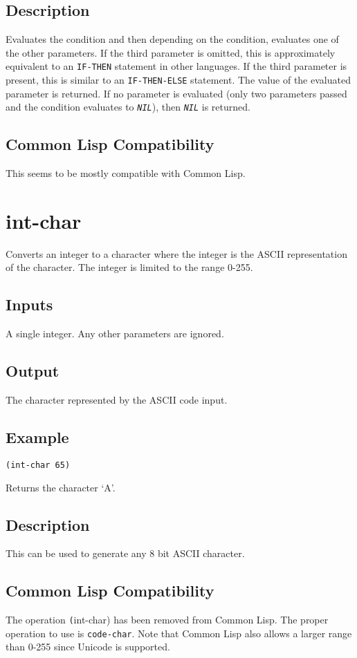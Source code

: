 \documentclass[10pt, openany]{book}
\newcommand{\constant}[1]{\emph{\texttt{#1}}}
\newcommand{\keyword}[1]{\texttt{#1}}
\newcommand{\cl}{Common Lisp}
\begin{document}
\subsection{Description}
Evaluates the condition and then depending on the condition, evaluates one of the other parameters.  If the third parameter is omitted, this is approximately equivalent to an \keyword{IF-THEN} statement in other languages.  If the third parameter is present, this is similar to an \keyword{IF-THEN-ELSE} statement.  The value of the evaluated parameter is returned.  If no parameter is evaluated (only two parameters passed and the condition evaluates to \constant{NIL}), then \constant{NIL} is returned.
\subsection{Common Lisp Compatibility}
This seems to be mostly compatible with \cl.

\section{int-char}
Converts an integer to a character where the integer is the ASCII representation of the character.  The integer is limited to the range 0-255.
\subsection{Inputs}
A single integer.  Any other parameters are ignored.
\subsection{Output}
The character represented by the ASCII code input.
\subsection{Example}
\begin{lstlisting}
(int-char 65)
\end{lstlisting}
Returns the character `A'.
\subsection{Description}
This can be used to generate any 8 bit ASCII character.
\subsection{Common Lisp Compatibility}
The operation \keyword(int-char) has been removed from \cl.  The proper operation to use is \keyword{code-char}.  Note that \cl{} also allows a larger range than 0-255 since Unicode is supported.
\end{document}
